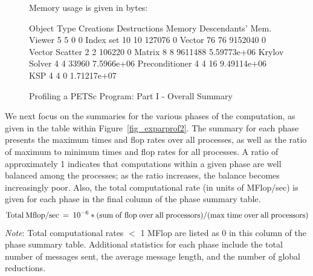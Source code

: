 \begin{figure}[tb]
\begin{outputlisting}[\tiny\ttfamily]
Memory usage is given in bytes:

Object Type      Creations   Destructions   Memory  Descendants' Mem.
Viewer                5              5          0     0
Index set            10             10     127076     0
Vector               76             76    9152040     0
Vector Scatter        2              2     106220     0
Matrix                8              8    9611488     5.59773e+06
Krylov Solver         4              4      33960     7.5966e+06
Preconditioner        4              4         16     9.49114e+06
KSP                   4              4          0     1.71217e+07
\end{outputlisting}
\caption{Profiling a PETSc Program: Part I - Overall Summary}
\label{fig_exparprof}
\end{figure}

We next focus on the summaries for the various phases of the
computation, as given in the table within Figure~\ref{fig_exparprof2}.  The summary for
each phase presents the maximum times and flop rates over all
processes, as well as the ratio of maximum to minimum times and flop
rates for all processes.  A ratio of approximately 1 indicates that
computations within a given phase are well balanced among the
processes; as the ratio increases, the balance becomes increasingly
poor.  Also, the total computational rate (in units of MFlop/sec) is
given for each phase in the final column of the phase summary table.
\[
   {\rm Total\: Mflop/sec} \:=\: 10^{-6} * ({\rm sum\; of\; flop\; over\; all\; processors})/({\rm max\; time\; over\; all\; processors})
\]
{\em Note}: Total computational rates $<$ 1 MFlop are listed as 0 in this column
of the phase summary table.
Additional statistics for each phase include the total number of messages sent,
the average message length, and the number of global reductions.

